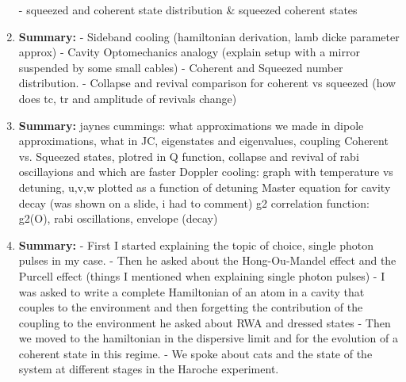 \documentclass{article}%
\begin{document}
\begin{enumerate}
{-} squeezed and coherent state distribution \& squeezed coherent states%
\item%
\begin{mycolorbox}%
\textbf{Summary:}%
\newline%
{-} Sideband cooling (hamiltonian derivation, lamb dicke parameter approx)\newline%
{-} Cavity Optomechanics analogy (explain setup with a mirror suspended by some small cables)\newline%
{-} Coherent and Squeezed number distribution.\newline%
{-} Collapse and revival comparison for coherent vs squeezed (how does tc, tr and amplitude of revivals change)%
\end{mycolorbox}%
\item%
\textbf{Summary:}%
\newline%
jaynes cummings: what approximations we made in dipole approximations, what in JC, eigenstates and eigenvalues, coupling \newline%
Coherent vs. Squeezed states, plotred in Q function, collapse and revival of rabi oscillayions and which are faster\newline%
Doppler cooling: graph with temperature vs detuning, u,v,w plotted as a function of detuning\newline%
Master equation for cavity decay (was shown on a slide, i had to comment)\newline%
g2 correlation function: g2(O), rabi oscillations, envelope (decay)%
\item%
\begin{mycolorbox}%
\textbf{Summary:}%
\newline%
{-} First I started explaining the topic of choice, single photon pulses in my case.\newline%
{-} Then he asked about the Hong{-}Ou{-}Mandel effect and the Purcell effect (things I mentioned when explaining single photon pulses)\newline%
{-} I was asked to write a complete Hamiltonian of an atom in a cavity that couples to the environment and then forgetting the contribution of the coupling to the environment he asked about RWA and dressed states\newline%
{-} Then we moved to the hamiltonian in the dispersive limit and for the evolution of a coherent state in this regime.\newline%
{-} We spoke about cats and the state of the system at different stages in the Haroche experiment.\newline%

\end{mycolorbox}
\end{enumerate}
\end{document}

